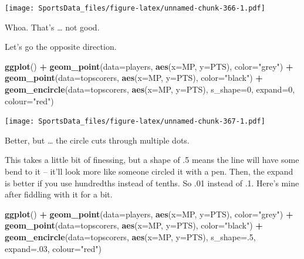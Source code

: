 \documentclass[
]{book}
\newenvironment{Shaded}{\begin{snugshade}}{\end{snugshade}}
\newcommand{\DataTypeTok}[1]{\textcolor[rgb]{0.13,0.29,0.53}{#1}}
\newcommand{\DecValTok}[1]{\textcolor[rgb]{0.00,0.00,0.81}{#1}}
\newcommand{\KeywordTok}[1]{\textcolor[rgb]{0.13,0.29,0.53}{\textbf{#1}}}
\newcommand{\NormalTok}[1]{#1}
\newcommand{\OperatorTok}[1]{\textcolor[rgb]{0.81,0.36,0.00}{\textbf{#1}}}
\newcommand{\StringTok}[1]{\textcolor[rgb]{0.31,0.60,0.02}{#1}}
\begin{document}
\texttt{[image: SportsData\_files/figure-latex/unnamed-chunk-366-1.pdf]}

Whoa. That's \ldots{} not good.

Let's go the opposite direction.

\begin{Shaded}
\begin{Highlighting}[]
\KeywordTok{ggplot}\NormalTok{() }\OperatorTok{+}\StringTok{ }
\StringTok{  }\KeywordTok{geom_point}\NormalTok{(}\DataTypeTok{data=}\NormalTok{players, }\KeywordTok{aes}\NormalTok{(}\DataTypeTok{x=}\NormalTok{MP, }\DataTypeTok{y=}\NormalTok{PTS), }\DataTypeTok{color=}\StringTok{"grey"}\NormalTok{) }\OperatorTok{+}\StringTok{ }
\StringTok{  }\KeywordTok{geom_point}\NormalTok{(}\DataTypeTok{data=}\NormalTok{topscorers, }\KeywordTok{aes}\NormalTok{(}\DataTypeTok{x=}\NormalTok{MP, }\DataTypeTok{y=}\NormalTok{PTS), }\DataTypeTok{color=}\StringTok{"black"}\NormalTok{) }\OperatorTok{+}\StringTok{ }
\StringTok{  }\KeywordTok{geom_encircle}\NormalTok{(}\DataTypeTok{data=}\NormalTok{topscorers, }\KeywordTok{aes}\NormalTok{(}\DataTypeTok{x=}\NormalTok{MP, }\DataTypeTok{y=}\NormalTok{PTS), }\DataTypeTok{s_shape=}\DecValTok{0}\NormalTok{, }\DataTypeTok{expand=}\DecValTok{0}\NormalTok{, }\DataTypeTok{colour=}\StringTok{"red"}\NormalTok{)}
\end{Highlighting}
\end{Shaded}

\texttt{[image: SportsData\_files/figure-latex/unnamed-chunk-367-1.pdf]}

Better, but \ldots{} the circle cuts through multiple dots.

This takes a little bit of finessing, but a shape of .5 means the line will have some bend to it -- it'll look more like someone circled it with a pen. Then, the expand is better if you use hundredths instead of tenths. So .01 instead of .1. Here's mine after fiddling with it for a bit.

\begin{Shaded}
\begin{Highlighting}[]
\KeywordTok{ggplot}\NormalTok{() }\OperatorTok{+}\StringTok{ }
\StringTok{  }\KeywordTok{geom_point}\NormalTok{(}\DataTypeTok{data=}\NormalTok{players, }\KeywordTok{aes}\NormalTok{(}\DataTypeTok{x=}\NormalTok{MP, }\DataTypeTok{y=}\NormalTok{PTS), }\DataTypeTok{color=}\StringTok{"grey"}\NormalTok{) }\OperatorTok{+}\StringTok{ }
\StringTok{  }\KeywordTok{geom_point}\NormalTok{(}\DataTypeTok{data=}\NormalTok{topscorers, }\KeywordTok{aes}\NormalTok{(}\DataTypeTok{x=}\NormalTok{MP, }\DataTypeTok{y=}\NormalTok{PTS), }\DataTypeTok{color=}\StringTok{"black"}\NormalTok{) }\OperatorTok{+}\StringTok{ }
\StringTok{  }\KeywordTok{geom_encircle}\NormalTok{(}\DataTypeTok{data=}\NormalTok{topscorers, }\KeywordTok{aes}\NormalTok{(}\DataTypeTok{x=}\NormalTok{MP, }\DataTypeTok{y=}\NormalTok{PTS), }\DataTypeTok{s_shape=}\NormalTok{.}\DecValTok{5}\NormalTok{, }\DataTypeTok{expand=}\NormalTok{.}\DecValTok{03}\NormalTok{, }\DataTypeTok{colour=}\StringTok{"red"}\NormalTok{)}
\end{Highlighting}
\end{Shaded}
\end{document}
